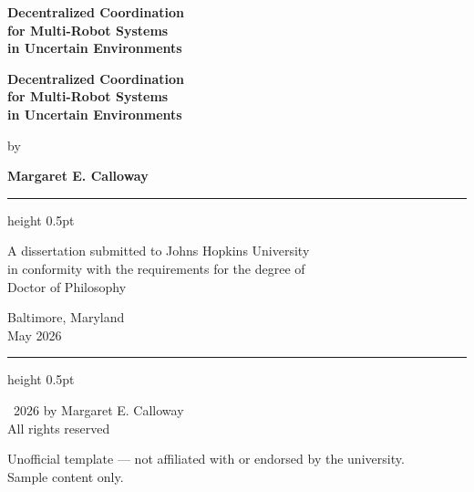 \documentclass[12pt,oneside]{report}
\begin{document}
\thispagestyle{empty}
\vspace*{0.4\textheight}
\begin{center}
  {\Huge\bfseries\color{jhublue} Decentralized Coordination}\\[14pt]
  {\Huge\bfseries\color{jhublue} for Multi-Robot Systems}\\[14pt]
  {\Huge\bfseries\color{jhublue} in Uncertain Environments}
\end{center}
\clearpage

\thispagestyle{empty}
\begin{center}

\vspace*{18pt}

{\Huge\bfseries\color{jhublue} Decentralized Coordination}\\[10pt]
{\Huge\bfseries\color{jhublue} for Multi-Robot Systems}\\[10pt]
{\Huge\bfseries\color{jhublue} in Uncertain Environments}

\vspace{32pt}

{\large\color{jhuslate} by}

\vspace{16pt}

{\Large\bfseries\color{jhuslate} Margaret E. Calloway}

\vspace{60pt}

{
\color{jhublue}\hrule height 0.5pt
\vspace{16pt}
}

{\normalsize\color{jhuslate}
A dissertation submitted to Johns Hopkins University\\
in conformity with the requirements for the degree of\\
Doctor of Philosophy}

\vspace{16pt}

{\normalsize\color{jhuslate}
Baltimore, Maryland\\
May 2026}

\vspace{40pt}

{
\color{jhublue}\hrule height 0.5pt
}

\vspace{24pt}

{\footnotesize\color{jhublue}
\textcopyright\ 2026 by Margaret E. Calloway\\
All rights reserved}

\vfill

{\scriptsize\color{gray}
Unofficial template --- not affiliated with or endorsed by the university.\\
Sample content only.}

\end{center}
\clearpage
\end{document}
